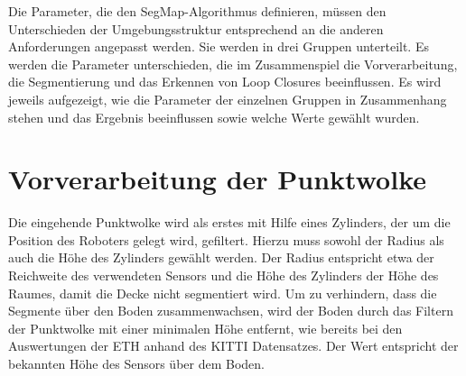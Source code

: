 %
%

Die Parameter, die den SegMap-Algorithmus definieren, müssen den Unterschieden der Umgebungsstruktur entsprechend an die anderen  Anforderungen angepasst werden. %
Sie werden in drei Gruppen unterteilt. Es werden die Parameter unterschieden, die im Zusammenspiel die Vorverarbeitung, die Segmentierung und das Erkennen von Loop Closures beeinflussen. Es wird jeweils aufgezeigt, wie die Parameter der einzelnen Gruppen in Zusammenhang stehen und das Ergebnis beeinflussen sowie welche Werte gewählt wurden. 


\section[Vorverarbeitung der Punktwolke (Schmelzer)]{Vorverarbeitung der Punktwolke}

Die eingehende Punktwolke wird als erstes mit Hilfe eines Zylinders, der um  die Position des Roboters gelegt wird, gefiltert. Hierzu muss sowohl der Radius als auch die Höhe des Zylinders gewählt werden. Der Radius entspricht etwa der Reichweite des verwendeten Sensors und die Höhe des Zylinders der Höhe des Raumes, damit die Decke nicht segmentiert wird. Um zu verhindern, dass die Segmente über den Boden zusammenwachsen, wird der Boden durch das Filtern der Punktwolke mit einer minimalen Höhe entfernt, wie bereits bei den Auswertungen der ETH anhand des KITTI Datensatzes. Der Wert entspricht der bekannten Höhe des Sensors über dem Boden.

